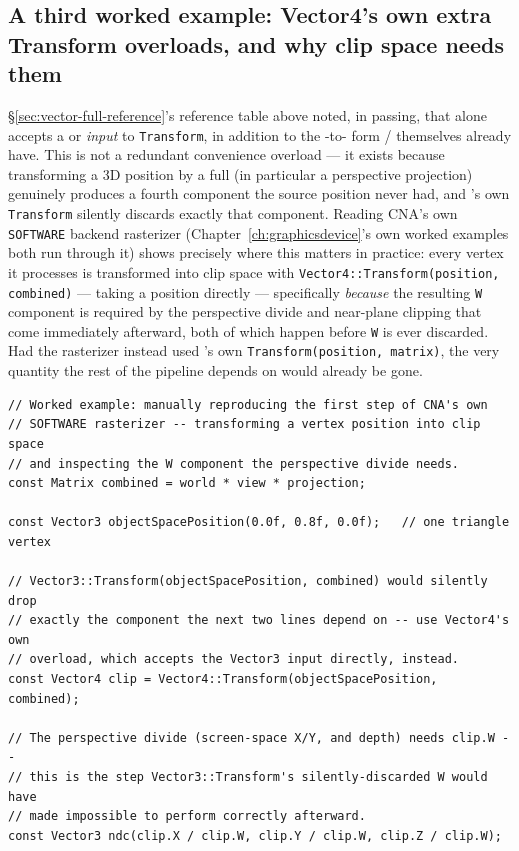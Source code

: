 \subsection{A third worked example: Vector4's own extra Transform overloads, and why clip space needs them}

\S\ref{sec:vector-full-reference}'s reference table above noted, in passing, that
 alone accepts a  or  \emph{input} to
\texttt{Transform}, in addition to the -to- form
/ themselves already have. This is not a redundant
convenience overload --- it exists because transforming a 3D position by a full
 (in particular a perspective projection) genuinely produces a fourth
component the source position never had, and 's own \texttt{Transform}
silently discards exactly that component. Reading CNA's own \texttt{SOFTWARE} backend
rasterizer (Chapter~\ref{ch:graphicsdevice}'s own worked examples both run through it) shows
precisely where this matters in practice: every vertex it processes is transformed into clip
space with \texttt{Vector4::Transform(position, combined)} --- taking a 
position directly --- specifically \emph{because} the resulting \texttt{W} component is
required by the perspective divide and near-plane clipping that come immediately afterward,
both of which happen before \texttt{W} is ever discarded. Had the rasterizer instead used
's own \texttt{Transform(position, matrix)}, the very quantity the rest of
the pipeline depends on would already be gone.

\begin{lstlisting}
// Worked example: manually reproducing the first step of CNA's own
// SOFTWARE rasterizer -- transforming a vertex position into clip space
// and inspecting the W component the perspective divide needs.
const Matrix combined = world * view * projection;

const Vector3 objectSpacePosition(0.0f, 0.8f, 0.0f);   // one triangle vertex

// Vector3::Transform(objectSpacePosition, combined) would silently drop
// exactly the component the next two lines depend on -- use Vector4's own
// overload, which accepts the Vector3 input directly, instead.
const Vector4 clip = Vector4::Transform(objectSpacePosition, combined);

// The perspective divide (screen-space X/Y, and depth) needs clip.W --
// this is the step Vector3::Transform's silently-discarded W would have
// made impossible to perform correctly afterward.
const Vector3 ndc(clip.X / clip.W, clip.Y / clip.W, clip.Z / clip.W);
\end{lstlisting}

